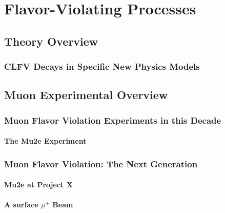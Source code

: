 \section{Flavor-Violating Processes}\label{sec:cl:fv}


\subsection{Theory Overview}\label{sec:cl:fvt}


\subsubsection{CLFV Decays in Specific New Physics Models}




\subsection{Muon Experimental Overview}\label{sec:cl:muexp}

\subsubsection{Muon Flavor Violation Experiments in this Decade}
\paragraph{The Mu2e Experiment}


\subsubsection{Muon Flavor Violation: The Next Generation}

\paragraph{Mu2e at Project X}


\paragraph{A surface $\mu^+$ Beam}


